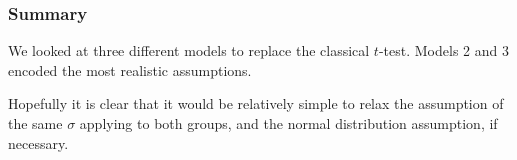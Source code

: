 \documentclass{beamer}
\begin{document}
\begin{frame}[fragile]
\frametitle{Summary}
We looked at three different models to replace the classical $t$-test.
Models 2 and 3 encoded the most realistic assumptions.\\[0.5em]\pause

Hopefully it is clear that it would be relatively simple to relax the
assumption of the same $\sigma$ applying to both groups, and the normal
distribution assumption, if necessary.
\end{frame}
\end{document}
